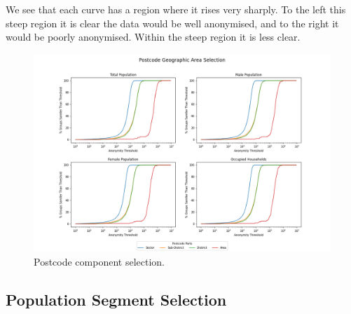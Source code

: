 \documentclass[12pt, a4paper]{article}
\begin{document}
We see that each curve has a region where it rises very sharply. To the left this steep region it is clear the data would be well anonymised, and to the right it would be poorly anonymised. Within the steep region it is less clear.

\begin{figure}
\includegraphics[width=1\textwidth,trim={3cm, 0cm, 3cm, 0cm},clip]{images/postode_selection.png}
\caption{Postcode component selection.}\label{fig:postcode_selection}
\end{figure}

\subsection{Population Segment Selection}
\end{document}
